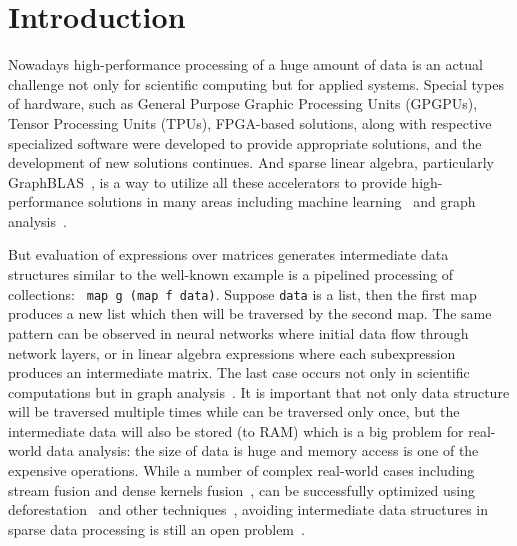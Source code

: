 \section{Introduction}

Nowadays high-performance processing of a huge amount of data is an actual challenge not only for scientific computing but for applied systems.
Special types of hardware, such as General Purpose Graphic Processing Units (GPGPUs), Tensor Processing Units (TPUs), FPGA-based solutions, along with respective specialized software were developed to provide appropriate solutions, and the development of new solutions continues.
And sparse linear algebra, particularly GraphBLAS~\cite{buluc2017graphblas}, is a way to utilize all these accelerators to provide high-performance solutions in many areas including machine learning~\cite{Kepner2017} and graph analysis~\cite{graphblast}.


But evaluation of expressions over matrices generates intermediate data structures similar to the well-known example is a pipelined processing of collections: \verb| map g (map f data)|. Suppose \verb|data| is a list, then the first map produces a new list which then will be traversed by the second map. The same pattern can be observed in neural networks where initial data flow through network layers, or in linear algebra expressions where each subexpression produces an intermediate matrix. The last case occurs not only in scientific computations but in graph analysis~\cite{graphblast}. It is important that not only data structure will be traversed multiple times while can be traversed only once, but the intermediate data will also be stored (to RAM) which is a big problem for real-world data analysis: the size of data is huge and memory access is one of the expensive operations.
While a number of complex real-world cases including stream fusion and dense kernels fusion~\cite{fusion-boosting-memory-computations}, can be successfully optimized using deforestation~\cite{wadler-deforestation,wadler-deforestation-ho} and other techniques~, avoiding intermediate data structures in sparse data processing is still an open problem~\cite{graphblast}.
